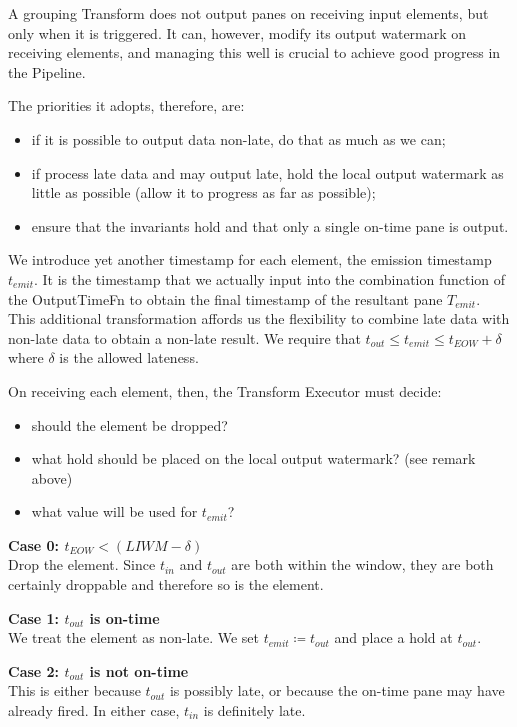A grouping Transform does not output panes on receiving input elements, but only when it is triggered.
It can, however, modify its output watermark on receiving elements, and managing this well is crucial to achieve good progress in the Pipeline.

The priorities it adopts, therefore, are:
\begin{itemize}
	\item if it is possible to output data non-late, do that as much as we can;
	\item if process late data and may output late, hold the local output watermark as little as possible (allow it to progress as far as possible);
	\item ensure that the invariants hold and that only a single on-time pane is output.
\end{itemize}

We introduce yet another timestamp for each element, the emission timestamp $t_{\mathit{emit}}$.
It is the timestamp that we actually input into the combination function of the OutputTimeFn to obtain the final timestamp of the resultant pane $T_{\mathit{emit}}$.
This additional transformation affords us the flexibility to combine late data with non-late data to obtain a non-late result.
We require that $t_{\mathit{out}} \leq t_{\mathit{emit}} \leq t_{\mathit{EOW}} + \delta$ where $\delta$ is the allowed lateness.

On receiving each element, then, the Transform Executor must decide:
\begin{itemize}
	\item should the element be dropped?
	\item what hold should be placed on the local output watermark? (see remark above)
	\item what value will be used for $t_{\mathit{emit}}$?
\end{itemize}

\textbf{Case 0: $t_{\mathit{EOW}} < (\mathit{LIWM} - \delta)$}\\
Drop the element.
Since $t_{\mathit{in}}$ and $t_{\mathit{out}}$ are both within the window, they are both certainly droppable and therefore so is the element.

\textbf{Case 1: $t_{\mathit{out}}$ is on-time}\\
We treat the element as non-late.
We set $t_{\mathit{emit}} \coloneq t_{\mathit{out}}$ and place a hold at $t_{\mathit{out}}$.

\textbf{Case 2: $t_{\mathit{out}}$ is not on-time}\\
This is either because $t_{\mathit{out}}$ is possibly late, or because the on-time pane may have already fired.
In either case, $t_{\mathit{in}}$ is definitely late.


